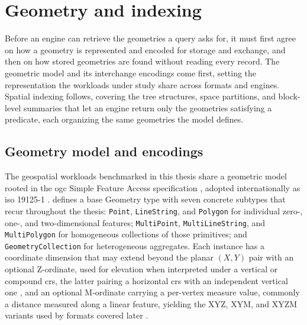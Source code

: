 \section{Geometry and indexing}
\label{background:geometry-and-indexing}

Before an engine can retrieve the geometries a query asks for, it must first agree on how a geometry is represented and encoded for storage and exchange, and then on how stored geometries are found without reading every record. The geometric model and its interchange encodings come first, setting the representation the workloads under study share across formats and engines. Spatial indexing follows, covering the tree structures, space partitions, and block-level summaries that let an engine return only the geometries satisfying a predicate, each organizing the same geometries the model defines.

\subsection{Geometry model and encodings}
\label{background:geometry-and-indexing:geometry-model-and-encodings}
The geospatial workloads benchmarked in this thesis share a geometric model rooted in the \acrfull{ogc} Simple Feature Access specification \parencite{herring2011_simple_feature_access_part1}, adopted internationally as \acrshort{iso} 19125-1 \parencite{iso2004_19125_1_simple_feature_access}. \textcite{herring2011_simple_feature_access_part1} defines a base Geometry type with seven concrete subtypes that recur throughout the thesis: \texttt{Point}, \texttt{LineString}, and \texttt{Polygon} for individual zero-, one-, and two-dimensional features; \texttt{MultiPoint}, \texttt{MultiLineString}, and \texttt{MultiPolygon} for homogeneous collections of those primitives; and \texttt{GeometryCollection} for heterogeneous aggregates. Each instance has a coordinate dimension that may extend beyond the planar $(X, Y)$ pair with an optional Z-ordinate, used for elevation when interpreted under a vertical or compound \acrfull{crs}, the latter pairing a horizontal \acrshort{crs} with an independent vertical one \parencite{iso2019_19111_referencing_by_coordinates}, and an optional M-ordinate carrying a per-vertex measure value, commonly a distance measured along a linear feature, yielding the XYZ, XYM, and XYZM variants used by formats covered later \parencite{herring2011_simple_feature_access_part1}.

